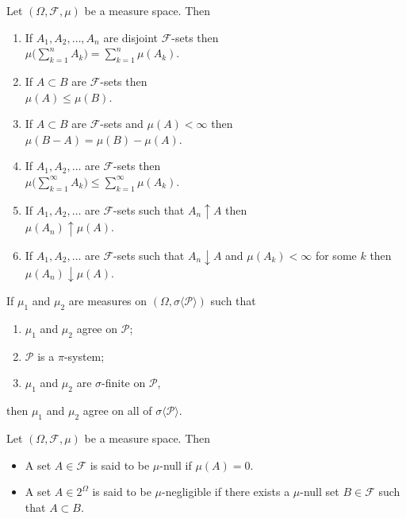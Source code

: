 \begin{theorem}
Let $(\Omega, \mathcal F, \mu)$ be a measure space. Then
\begin{enumerate}
\item If $A_1, A_2,\ldots, A_n$ are disjoint $\mathcal F$-sets then \\$\mu\bigl(\sum_{k=1}^n A_k\bigr) = \sum_{k=1}^n \mu(A_k)$.
\item If $A\subset B$ are $\mathcal F$-sets then \\$\mu(A)\leq \mu(B)$.
\item If $A\subset B$ are $\mathcal F$-sets and {$\mu(A)<\infty$} then \\$\mu(B-A)=\mu(B)-\mu(A)$.
\item If $A_1, A_2,\ldots $ are $\mathcal F$-sets then \\$\mu\bigl(\sum_{k=1}^\infty A_k\bigr) \leq \sum_{k=1}^\infty \mu(A_k)$.
\item If  $A_1, A_2,\ldots $ are $\mathcal F$-sets such that $A_n\uparrow A$ then \\$\mu(A_n)\uparrow \mu(A)$.
\item If  $A_1, A_2,\ldots $ are $\mathcal F$-sets such that $A_n\downarrow A$ and {$\mu(A_k)<\infty$} for some $k$ then $\mu(A_n)\downarrow \mu(A)$.
\end{enumerate}
\end{theorem}


\begin{theorem}
\label{uui}
If $\mu_1$ and $\mu_2$ are measures on $(\Omega, \sigma\langle \mathcal P\rangle)$ such that
\begin{enumerate}
\item $\mu_1$ and $\mu_2$ agree on $\mathcal P$;
\item $\mathcal P$ is a $\pi$-system;
\item $\mu_1$ and $\mu_2$ are $\sigma$-finite on $\mathcal P$,
\end{enumerate}
then $\mu_1$ and $\mu_2$ agree on all of $ \sigma\langle \mathcal P\rangle$.
\end{theorem}




\begin{definition}
Let $(\Omega,\mathcal F, \mu)$ be a measure space. Then
\begin{itemize}
\item
A set $A\in \mathcal F$ is said to be {$\mu$-null}  if $\mu(A)=0$.
\item
A set $A\in 2^\Omega$ is said to be {$\mu$-negligible} if there exists a $\mu$-null set  $B\in \mathcal F$ such that $A\subset B$.
\end{itemize}
\end{definition}



